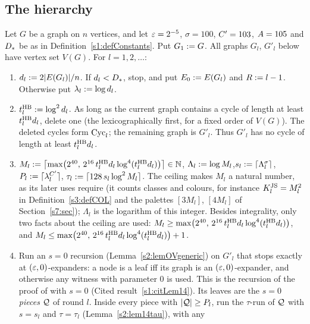 \subsection{The hierarchy}

\begin{definition}\label{s2:defHBtp}
Let $G$ be a graph on $n$ vertices, and let $\varepsilon=2^{-5}$, $\sigma=100$,
$C'=103$, $A=105$ and $D_{*}$ be as in Definition~\ref{s1:defConstants}.
Put $G_1\mathrel{:=} G$. All graphs $G_l$, $G'_l$ below have vertex set $V(G)$. For
$l=1,2,\dots$:
\begin{enumerate}
\item[(R0)] $d_l\mathrel{:=}2|E(G_l)|/n$. If $d_l<D_{*}$,
stop, and put $E_0\mathrel{:=} E(G_l)$ and $R\mathrel{:=} l-1$. Otherwise put
$\lambda_l\mathrel{:=}\log d_l$.
\item[(R1)] $t^{\mathrm{HB}}_l\mathrel{:=}\log^2d_l$. As long as the
current graph contains a cycle of length at least $t^{\mathrm{HB}}_ld_l$, delete one (the
lexicographically first, for a fixed order of $V(G)$). The deleted cycles form
$\mathrm{Cyc}_l$; the remaining graph is $G'_l$. Thus $G'_l$ has no cycle of length at
least $t^{\mathrm{HB}}_ld_l$.
\item[(R2)]
$M_l\mathrel{:=}\bigl\lceil\max\bigl(2^{40},\,2^{16}\,t^{\mathrm{HB}}_ld_l\log^4(t^{\mathrm{HB}}_ld_l)\bigr)\bigr\rceil\in\mathbb N$,\quad
$\Lambda_l\mathrel{:=}\log M_l$,\quad $s_l\mathrel{:=}\lceil\Lambda_l^{\sigma}\rceil$,\quad
$P_l\mathrel{:=}\lceil\lambda_l^{C'}\rceil$,\quad
$\tau_l\mathrel{:=}\lceil128\,s_l\log^2M_l\rceil$.
The ceiling makes $M_l$ a natural number, as its later uses require (it counts
classes and colours, for instance $K^{\mathrm{JS}}_l=M_l^2$ in Definition~\ref{s3:defCOL}
and the palettes $[3M_l]$, $[4M_l]$ of Section~\ref{s7:sec}); $\Lambda_l$ is the
logarithm of this integer. Besides integrality, only two facts about the ceiling are used:
$M_l\ge\max\bigl(2^{40},\,2^{16}\,t^{\mathrm{HB}}_ld_l\log^4(t^{\mathrm{HB}}_ld_l)\bigr)$, and
$M_l\le\max\bigl(2^{40},\,2^{16}\,t^{\mathrm{HB}}_ld_l\log^4(t^{\mathrm{HB}}_ld_l)\bigr)+1$.
\item[(R3)] Run an $s=0$ recursion
(Lemma~\ref{s2:lemOVgeneric}) on $G'_l$ that stops exactly at
$(\varepsilon,0)$-expanders: a node is a leaf iff its graph is an
$(\varepsilon,0)$-expander, and otherwise any witness with parameter $0$ is used. This
is the recursion of the proof of \cite[Lemma~14]{BM} with $s=0$ (Cited
result~\ref{s1:citLem14}). Its leaves are the \emph{$s=0$ pieces} $\mathcal{Q}$ of
round $l$. Inside every piece with $|\mathcal{Q}|\ge P_l$, run the $\tau$-run of
$\mathcal{Q}$ with $s=s_l$ and $\tau=\tau_l$ (Lemma~\ref{s2:lem14tau}), with any

\end{enumerate}
\end{definition}
